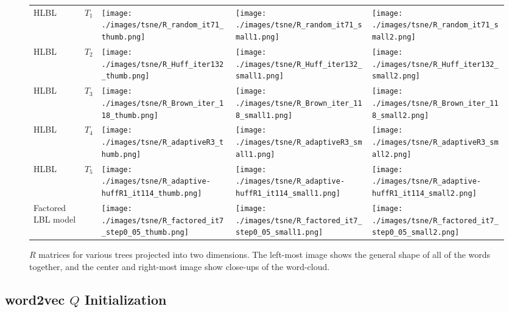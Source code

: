 \begin{figure}[p]
\centering
\begin{tabular}{@{}m{1cm}m{1cm}m{3.5cm}m{3.5cm}m{3.5cm}@{}}

HLBL & $T_1$ &
\texttt{[image: ./images/tsne/R\_random\_it71\_thumb.png]} &
\texttt{[image: ./images/tsne/R\_random\_it71\_small1.png]} &
\texttt{[image: ./images/tsne/R\_random\_it71\_small2.png]}
\\
HLBL & $T_2$ &
\texttt{[image: ./images/tsne/R\_Huff\_iter132\_thumb.png]} &
\texttt{[image: ./images/tsne/R\_Huff\_iter132\_small1.png]} &
\texttt{[image: ./images/tsne/R\_Huff\_iter132\_small2.png]}
\\
HLBL & $T_3$ &
\texttt{[image: ./images/tsne/R\_Brown\_iter\_118\_thumb.png]} &
\texttt{[image: ./images/tsne/R\_Brown\_iter\_118\_small1.png]} &
\texttt{[image: ./images/tsne/R\_Brown\_iter\_118\_small2.png]}
\\
HLBL & $T_4$ &
\texttt{[image: ./images/tsne/R\_adaptiveR3\_thumb.png]} &
\texttt{[image: ./images/tsne/R\_adaptiveR3\_small1.png]} &
\texttt{[image: ./images/tsne/R\_adaptiveR3\_small2.png]}
\\
HLBL &$T_5$ &
\texttt{[image: ./images/tsne/R\_adaptive-huffR1\_it114\_thumb.png]} &
\texttt{[image: ./images/tsne/R\_adaptive-huffR1\_it114\_small1.png]} &
\texttt{[image: ./images/tsne/R\_adaptive-huffR1\_it114\_small2.png]}
\\
Factored LBL model &  &
\texttt{[image: ./images/tsne/R\_factored\_it7\_step0\_05\_thumb.png]} &
\texttt{[image: ./images/tsne/R\_factored\_it7\_step0\_05\_small1.png]} &
\texttt{[image: ./images/tsne/R\_factored\_it7\_step0\_05\_small2.png]}
\end{tabular}
\caption{$R$ matrices for various trees projected into two dimensions. The left-most image shows the general shape of all of the words together, and the center and right-most image show close-ups of the word-cloud.}
\label{fig:Rcloud}
\end{figure}

\subsection{word2vec $Q$ Initialization} \label{sec:ADAPTIVEQ}
